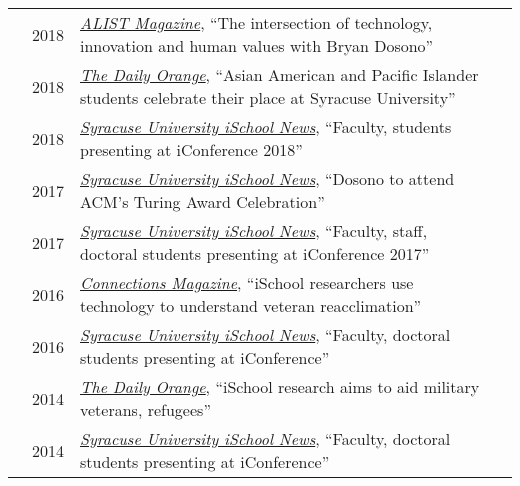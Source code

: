 \documentclass[12pt]{article}
\begin{document}
{{\begin{longtable}{Rp{1.0in}p{0.25in}p{4.75in}}
& \footnotesize{2018} & \href{https://issuu.com/alist_magazine/docs/alist_summer_2018_final}{\textit{{ALIST Magazine}}}, ``The intersection of technology, innovation and human values with Bryan Dosono'' \\

& \footnotesize{2018} & \href{http://dailyorange.com/2018/04/asian-american-pacific-islander-students-celebrate-place-syracuse-university/}{\textit{{The Daily Orange}}}, ``Asian American and Pacific Islander students celebrate their place at Syracuse University'' \\

& \footnotesize{2018} & \href{https://ischool.syr.edu/articles/news/view/faculty-students-presenting-iconference-2018/}{\textit{{Syracuse University iSchool News}}}, ``Faculty, students presenting at iConference 2018'' \\

& \footnotesize{2017} & \href{https://ischool.syr.edu/articles/news/view/dosono-to-attend-acm-turing-award-celebration/}{\textit{{Syracuse University iSchool News}}}, ``Dosono to attend ACM's Turing Award Celebration'' \\

& \footnotesize{2017} & \href{https://ischool.syr.edu/articles/news/view/faculty-staff-phd-students-presenting-iconference-2017/}{\textit{{Syracuse University iSchool News}}}, ``Faculty, staff, doctoral students presenting at iConference 2017'' \\

& \footnotesize{2016} & \href{https://issuu.com/kiefercreative/docs/suischool-connections-sp2016}{\textit{{Connections Magazine}}}, ``iSchool researchers use technology to understand veteran reacclimation'' \\

& \footnotesize{2016} & \href{https://ischool.syr.edu/articles/news/view/faculty-phd-students-presenting-at-iconference-2016/}{\textit{{Syracuse University iSchool News}}}, ``Faculty, doctoral students presenting at iConference'' \\

& \footnotesize{2014} & \href{http://dailyorange.com/2014/11/ischool-research-aims-to-aid-military-veterans-refugees/}{\textit{{The Daily Orange}},} ``iSchool research aims to aid military veterans, refugees'' \\

& \footnotesize{2014} & \href{https://ischool.syr.edu/articles/news/view/faculty-doctoral-students-presenting-at-iconference/}{\textit{{Syracuse University iSchool News}}}, ``Faculty, doctoral students presenting at iConference'' \\


\end{longtable}}}
\end{document}
